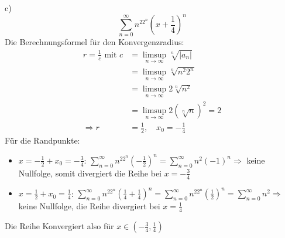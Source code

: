 \documentclass[a4paper]{article}
\begin{document}
\par{c)}
\[
	\sum_{n=0}^\infty n^22^n \left(x + \frac 1 4\right)^n
	\]
Die Berechnungsformel für den Konvergenzradius:
\begin{align*}
	r = \frac 1 c \text{ mit }
	c &= \limsup_{n\rightarrow\infty} \sqrt[n]{\vert a_n \vert} \\
	&= \limsup_{n\rightarrow\infty} \sqrt[n]{n^2 2^n} \\
	&= \limsup_{n\rightarrow\infty} 2 \sqrt[n]{n^2} \\
	&= \limsup_{n\rightarrow\infty} 2
	\left( \sqrt[n]{n} \right)^2 = 2 \\
	\Rightarrow
	r &= \frac 1 2, \quad x_0 = -\frac14
\end{align*}
Für die Randpunkte:
\begin{itemize}
	\item $x = -\frac12 + x_0 = -\frac34$: $\sum_{n=0}^\infty n^22^n 
		\left( -\frac12 \right)^n = 
		\sum_{n=0}^\infty n^2 (-1)^n
		\Rightarrow
		$
		keine Nullfolge, somit divergiert die Reihe bei 
		$x = -\frac34$
	\item $x = \frac12 + x_0 = \frac14$: $\sum_{n=0}^\infty n^22^n
		\left( \frac14 + \frac14 \right)^n
		=
		\sum_{n=0}^\infty n^22^n \left( \frac12 \right)^n
		=
		\sum_{n=0}^\infty n^2
		\Rightarrow
		$
		keine Nullfolge, die Reihe divergiert bei 
		$x = \frac14$
\end{itemize}
Die Reihe Konvergiert also für $x \in \left(-\frac34, \frac14\right)$

\vspace{0.5cm}
\setlength{\headheight}{0cm} 
\end{document}
